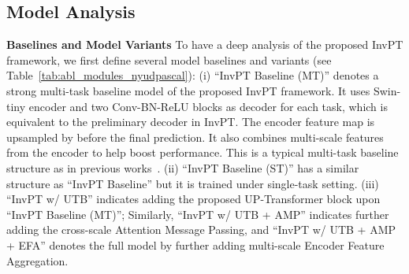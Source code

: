 \documentclass[runningheads]{llncs}
\begin{document}
\subsection{Model Analysis}
\par\noindent\textbf{Baselines and Model Variants} To have a deep analysis of the proposed InvPT framework, we first define several model baselines and variants (see Table~\ref{tab:abl_modules_nyudpascal}):
(i) {``InvPT Baseline (MT)''} denotes a strong multi-task baseline model of the proposed  InvPT framework. It uses Swin-tiny encoder and two  Conv-BN-ReLU blocks as decoder for each task, which is equivalent to the preliminary decoder in InvPT. The encoder feature map is upsampled by  before the final prediction. It also combines multi-scale features from the encoder to help boost performance. This is a typical multi-task baseline structure as in previous works~\cite{mti,atrc}.
(ii) ``InvPT Baseline (ST)'' has a similar structure as ``InvPT Baseline'' but it is trained under single-task setting. (iii) ``InvPT w/ UTB'' indicates adding the proposed UP-Transformer block upon ``InvPT Baseline (MT)''; Similarly, ``InvPT w/ UTB + AMP'' indicates further adding the cross-scale Attention Message Passing, and ``InvPT w/ UTB + AMP + EFA'' denotes the full model by further adding multi-scale Encoder Feature Aggregation.
\end{document}
